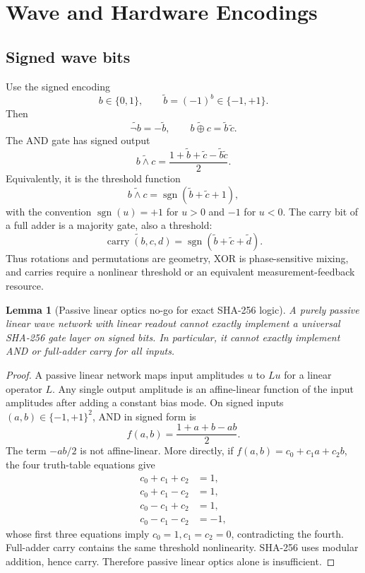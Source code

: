 \documentclass[11pt]{article}
\newtheorem{lemma}[theorem]{Lemma}
\theoremstyle{definition}
\theoremstyle{remark}
\newcommand{\bits}{\{0,1\}}
\newcommand{\pmone}{\{-1,+1\}}
\newcommand{\sgn}{\operatorname{sgn}}
\begin{document}
\section{Wave and Hardware Encodings}

\subsection{Signed wave bits}

Use the signed encoding
\[
b\in\bits,\qquad \tilde b=(-1)^b\in\pmone.
\]
Then
\[
\widetilde{\neg b}=-\tilde b,\qquad
\widetilde{b\oplus c}=\tilde b\,\tilde c.
\]
The AND gate has signed output
\[
\widetilde{b\wedge c}
=\frac{1+\tilde b+\tilde c-\tilde b\tilde c}{2}.
\]
Equivalently, it is the threshold function
\[
\widetilde{b\wedge c}
=\sgn(\tilde b+\tilde c+1),
\]
with the convention \(\sgn(u)=+1\) for \(u>0\) and \(-1\) for \(u<0\). The carry
bit of a full adder is a majority gate, also a threshold:
\[
\widetilde{\operatorname{carry}(b,c,d)}
=\sgn(\tilde b+\tilde c+\tilde d).
\]
Thus rotations and permutations are geometry, XOR is phase-sensitive mixing,
and carries require a nonlinear threshold or an equivalent measurement-feedback
resource.

\begin{lemma}[Passive linear optics no-go for exact SHA-256 logic]
\label{lem:linearno}
A purely passive linear wave network with linear readout cannot exactly
implement a universal SHA-256 gate layer on signed bits. In particular, it
cannot exactly implement AND or full-adder carry for all inputs.
\end{lemma}

\begin{proof}
A passive linear network maps input amplitudes \(u\) to \(Lu\) for a linear
operator \(L\). Any single output amplitude is an affine-linear function of the
input amplitudes after adding a constant bias mode. On signed inputs
\((a,b)\in\pmone^2\), AND in signed form is
\[
f(a,b)=\frac{1+a+b-ab}{2}.
\]
The term \(-ab/2\) is not affine-linear. More directly, if
\(f(a,b)=c_0+c_1a+c_2b\), the four truth-table equations give
\[
\begin{aligned}
c_0+c_1+c_2&=1,\\
c_0+c_1-c_2&=1,\\
c_0-c_1+c_2&=1,\\
c_0-c_1-c_2&=-1,
\end{aligned}
\]
whose first three equations imply \(c_0=1,c_1=c_2=0\), contradicting the fourth.
Full-adder carry contains the same threshold nonlinearity. SHA-256 uses modular
addition, hence carry. Therefore passive linear optics alone is insufficient.
\end{proof}
\end{document}
